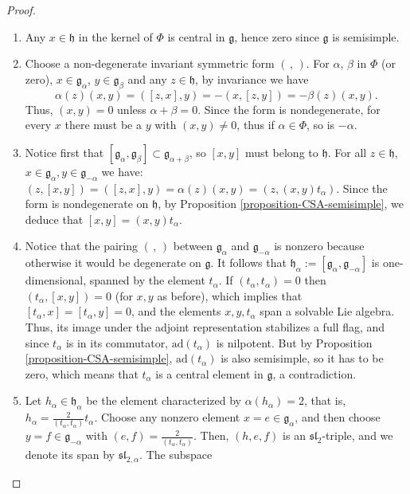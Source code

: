 \begin{proof}

\begin{enumerate}
 \item Any $x\in \mathfrak h$ in the kernel of $\Phi$ is central in $\mathfrak g$, hence zero since $\mathfrak g$ is semisimple.
 \item Choose a non-degenerate invariant symmetric form $(\,,\,)$. For $\alpha$, $\beta$ in $\Phi$ (or zero),  $x \in \mathfrak g_\alpha$, $y\in \mathfrak g_\beta$ and any $z\in \mathfrak h$, by invariance we have 
 $$ \alpha(z) (x,y) = ([z,x],y) = - (x, [z,y]) = -\beta(z) (x,y).$$
 Thus, $(x,y)=0$ unless $\alpha+\beta=0$. Since the form is nondegenerate, for every $x$ there must be a $y$ with $(x,y)\ne 0$, thus if $\alpha\in\Phi$, so is $-\alpha$. 
 \item Notice first that $[\mathfrak g_\alpha,\mathfrak g_\beta]\subset \mathfrak g_{\alpha+\beta}$, so $[x,y]$ must belong to $\mathfrak h$. For all $z\in \mathfrak h$, $x\in \mathfrak g_\alpha, y\in\mathfrak g_{-\alpha}$ we have: $(z,[x,y]) = ([z,x],y) = \alpha(z) (x,y) = (z, (x,y) t_\alpha)$. Since the form is nondegenerate on $\mathfrak h$, by Proposition \ref{proposition-CSA-semisimple}, we deduce that $[x,y] = (x,y) t_\alpha$. 
 \item Notice that the pairing $(\,,\,)$ between $\mathfrak g_\alpha$ and $\mathfrak g_{-\alpha}$ is nonzero because otherwise it would be degenerate on $\mathfrak g$. It follows that $\mathfrak h_\alpha:= [\mathfrak g_\alpha,\mathfrak g_{-\alpha}]$ is one-dimensional, spanned by the element $t_\alpha$. If $(t_\alpha, t_\alpha)=0$ then $(t_\alpha, [x,y])=0$ (for $x,y$ as before), which implies that $[t_\alpha, x]=[t_\alpha,y]=0$, and the elements $x, y, t_\alpha$ span a solvable Lie algebra. Thus, its image under the adjoint representation stabilizes a full flag, and since $t_\alpha$ is in its commutator, $\text{ad}(t_\alpha)$ is nilpotent. But by Proposition \ref{proposition-CSA-semisimple}, $\text{ad}(t_\alpha)$ is also semisimple, so it has to be zero, which means that $t_\alpha$ is a central element in $\mathfrak g$, a contradiction.
 \item Let $h_\alpha \in\mathfrak h_\alpha$ be the element characterized by $\alpha(h_\alpha)=2$, that is, $h_\alpha = \frac{2}{(t_\alpha,t_\alpha)} t_\alpha$. Choose any nonzero element $x=e \in \mathfrak g_\alpha$, and then choose $y=f\in\mathfrak g_{-\alpha}$ with $(e,f) = \frac{2}{(t_\alpha,t_\alpha)}$. Then, $(h,e,f)$ is an $\mathfrak{sl}_2$-triple, and we denote its span by $\mathfrak{sl}_{2,\alpha}$. The subspace

\end{enumerate}
\end{proof}
